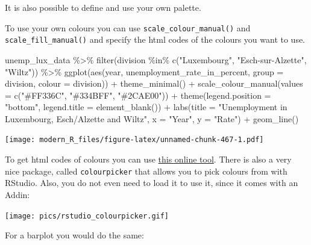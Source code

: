 \documentclass[
]{article}
\newenvironment{Shaded}{\begin{snugshade}}{\end{snugshade}}
\newcommand{\AttributeTok}[1]{\textcolor[rgb]{0.77,0.63,0.00}{#1}}
\newcommand{\FunctionTok}[1]{\textcolor[rgb]{0.00,0.00,0.00}{#1}}
\newcommand{\NormalTok}[1]{#1}
\newcommand{\SpecialCharTok}[1]{\textcolor[rgb]{0.00,0.00,0.00}{#1}}
\newcommand{\StringTok}[1]{\textcolor[rgb]{0.31,0.60,0.02}{#1}}
\begin{document}
It is also possible to define and use your own palette.

To use your own colours you can use \texttt{scale\_colour\_manual()} and \texttt{scale\_fill\_manual()} and specify
the html codes of the colours you want to use.

\begin{Shaded}
\begin{Highlighting}[]
\NormalTok{unemp\_lux\_data }\SpecialCharTok{\%\textgreater{}\%}
  \FunctionTok{filter}\NormalTok{(division }\SpecialCharTok{\%in\%} \FunctionTok{c}\NormalTok{(}\StringTok{"Luxembourg"}\NormalTok{, }\StringTok{"Esch{-}sur{-}Alzette"}\NormalTok{, }\StringTok{"Wiltz"}\NormalTok{)) }\SpecialCharTok{\%\textgreater{}\%}
  \FunctionTok{ggplot}\NormalTok{(}\FunctionTok{aes}\NormalTok{(year, unemployment\_rate\_in\_percent, }\AttributeTok{group =}\NormalTok{ division, }\AttributeTok{colour =}\NormalTok{ division)) }\SpecialCharTok{+}
  \FunctionTok{theme\_minimal}\NormalTok{() }\SpecialCharTok{+}
  \FunctionTok{scale\_colour\_manual}\NormalTok{(}\AttributeTok{values =} \FunctionTok{c}\NormalTok{(}\StringTok{"\#FF336C"}\NormalTok{, }\StringTok{"\#334BFF"}\NormalTok{, }\StringTok{"\#2CAE00"}\NormalTok{)) }\SpecialCharTok{+}
  \FunctionTok{theme}\NormalTok{(}\AttributeTok{legend.position =} \StringTok{"bottom"}\NormalTok{, }\AttributeTok{legend.title =} \FunctionTok{element\_blank}\NormalTok{()) }\SpecialCharTok{+}
  \FunctionTok{labs}\NormalTok{(}\AttributeTok{title =} \StringTok{"Unemployment in Luxembourg, Esch/Alzette and Wiltz"}\NormalTok{, }\AttributeTok{x =} \StringTok{"Year"}\NormalTok{, }\AttributeTok{y =} \StringTok{"Rate"}\NormalTok{) }\SpecialCharTok{+}
  \FunctionTok{geom\_line}\NormalTok{()}
\end{Highlighting}
\end{Shaded}

\texttt{[image: modern\_R\_files/figure-latex/unnamed-chunk-467-1.pdf]}

To get html codes of colours you can use \href{http://htmlcolorcodes.com/color-picker/}{this online
tool}.
There is also a very nice package, called \texttt{colourpicker} that allows you to
pick colours from with RStudio. Also, you do not even need to load it to use
it, since it comes with an Addin:

\texttt{[image: pics/rstudio\_colourpicker.gif]}

For a barplot you would do the same:
\end{document}
